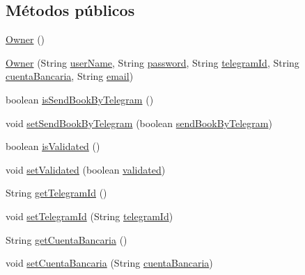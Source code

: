 \subsection*{Métodos públicos}
\begin{DoxyCompactItemize}
\item 
\mbox{\hyperlink{classdomain_1_1_owner_a2938f239b0a7088763c81266146d8f3f}{Owner}} ()
\item 
\mbox{\hyperlink{classdomain_1_1_owner_aacd09c8566d1377947340a67f78017de}{Owner}} (String \mbox{\hyperlink{classdomain_1_1_owner_aa8031c9e66a0cbd90d84dc6df66a25a3}{user\+Name}}, String \mbox{\hyperlink{classdomain_1_1_owner_af66aee27508c675e6f8cab193f0c215d}{password}}, String \mbox{\hyperlink{classdomain_1_1_owner_a7df022fa9c33f9661d4eac42d113585c}{telegram\+Id}}, String \mbox{\hyperlink{classdomain_1_1_owner_a0c0b7f7134349132b180d90c57181561}{cuenta\+Bancaria}}, String \mbox{\hyperlink{classdomain_1_1_owner_a37fce65d727c0c7d4fbc7d2c2493148c}{email}})
\item 
boolean \mbox{\hyperlink{classdomain_1_1_owner_a89052fe74fcb66cc60d3c7ee7d3e2d75}{is\+Send\+Book\+By\+Telegram}} ()
\item 
void \mbox{\hyperlink{classdomain_1_1_owner_a4541457ba4d275025e6134f9402a6c5e}{set\+Send\+Book\+By\+Telegram}} (boolean \mbox{\hyperlink{classdomain_1_1_owner_a134e9113c7b9ebcc36663b40d2415089}{send\+Book\+By\+Telegram}})
\item 
boolean \mbox{\hyperlink{classdomain_1_1_owner_a1c08ad86ccfe8d47bb7e1e9e8a8126be}{is\+Validated}} ()
\item 
void \mbox{\hyperlink{classdomain_1_1_owner_a6c9df0354092ead37755351953846cbe}{set\+Validated}} (boolean \mbox{\hyperlink{classdomain_1_1_owner_adec75a99c7addadf2226be54e9255ca8}{validated}})
\item 
String \mbox{\hyperlink{classdomain_1_1_owner_a6aef327c7dde889395788d062a64f102}{get\+Telegram\+Id}} ()
\item 
void \mbox{\hyperlink{classdomain_1_1_owner_ac024ef11aaf4d4875f421c75365e3c9e}{set\+Telegram\+Id}} (String \mbox{\hyperlink{classdomain_1_1_owner_a7df022fa9c33f9661d4eac42d113585c}{telegram\+Id}})
\item 
String \mbox{\hyperlink{classdomain_1_1_owner_a6d24ccea9d518464f4c6185a33ff4c6c}{get\+Cuenta\+Bancaria}} ()
\item 
void \mbox{\hyperlink{classdomain_1_1_owner_a585ddd63f0f59a3198fa98689b07635e}{set\+Cuenta\+Bancaria}} (String \mbox{\hyperlink{classdomain_1_1_owner_a0c0b7f7134349132b180d90c57181561}{cuenta\+Bancaria}})

\end{DoxyCompactItemize}
